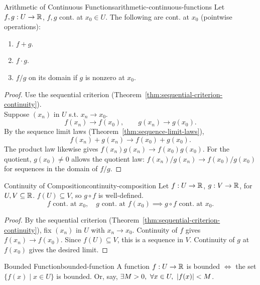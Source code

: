 \begin{theorem}{Arithmetic of Continuous Functions}{arithmetic-continuous-functions}
  Let $f,g:U\to\mathbb{R}$, $f,g$ cont. at $x_0\in U$.
  The following are cont. at $x_0$ (pointwise operations):
  \begin{enumerate}
    \item $f+g$.
    \item $f\cdot g$.
    \item $f/g$ on its domain if $g$ is nonzero at $x_0$.
  \end{enumerate}
\end{theorem}

\begin{proof}
  Use the sequential criterion (Theorem~\ref{thm:sequential-criterion-continuity}).\\
  Suppose $(x_n)$ in $U$ s.t. $x_n\to x_0$.
  \[
    f(x_n)\to f(x_0),\qquad g(x_n)\to g(x_0).
  \]
  By the sequence limit laws (Theorem~\ref{thm:sequence-limit-laws}),
  \[
    f(x_n)+g(x_n)\to f(x_0)+g(x_0).
  \]
  The product law likewise gives $f(x_n)g(x_n)\to f(x_0)g(x_0)$.
  For the quotient, $g(x_0)\ne0$ allows the quotient law:
  $f(x_n)/g(x_n)\to f(x_0)/g(x_0)$ for sequences in the domain of $f/g$.
\end{proof}

\begin{theorem}{Continuity of Composition}{continuity-composition}
  Let $f:U\to\mathbb{R}$, $g:V\to\mathbb{R}$, for $U,V\subseteq\mathbb{R}$.
  $f(U)\subseteq V$, so $g\circ f$ is well-defined.
  \[
    f\text{ cont. at }x_0,\quad g\text{ cont. at }f(x_0)
    \implies g\circ f\text{ cont. at }x_0.
  \]
\end{theorem}

\begin{proof}
  By the sequential criterion (Theorem~\ref{thm:sequential-criterion-continuity}),
  fix $(x_n)$ in $U$ with $x_n\to x_0$.
  Continuity of $f$ gives $f(x_n)\to f(x_0)$.
  Since $f(U)\subseteq V$, this is a sequence in $V$.
  Continuity of $g$ at $f(x_0)$ gives the desired limit.
\end{proof}

\begin{definition}{Bounded Function}{bounded-function}
  A function $f:U\to\mathbb{R}$ is bounded $\iff$ the set $\{f(x)\mid x\in U\}$ is bounded.
  Or, say, $\exists M>0,\ \forall x\in U,\ \left\lvert f(x) \right\rvert<M$.
\end{definition}

